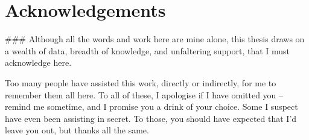 \documentclass[11pt,a4paper,final,twoside]{memoir}
\begin{document}
\chapter*{Acknowledgements}
###
Although all the words and work here are mine alone, this thesis draws on a wealth of data, breadth of knowledge, and unfaltering support, that I must acknowledge here.  

Too many people have assisted this work, directly or indirectly, for me to remember them all here.  To all of these, I apologise if I have omitted you -- remind me sometime, and I promise you a drink of your choice.  Some I suspect have even been assisting in secret.  To those, you should have expected that I'd leave you out, but thanks all the same.



\thispagestyle{empty}
\clearpage

\begin{abstract}
###
\end{abstract}
\thispagestyle{empty}
\clearpage

\pagestyle{plain}

\setcounter{tocdepth}{2}
\tableofcontents
\clearpage

\listoffigures
\clearpage

\listoftables

\listofalgorithms

\openany




\mainmatter
\openright





%




\backmatter

\printglossary

\renewcommand{\bibname}{References}


\end{document}
